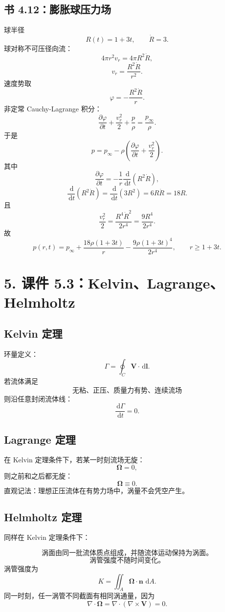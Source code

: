 \documentclass[UTF8,zihao=-4]{ctexart}
\newcommand{\dd}{\,\mathrm d}
\begin{document}
\subsection*{书 4.12：膨胀球压力场}

球半径
\[
R(t)=1+3t,\qquad \dot R=3.
\]
球对称不可压径向流：
\[
4\pi r^2v_r=4\pi R^2\dot R,
\]
\[
v_r=\frac{R^2\dot R}{r^2}.
\]
速度势取
\[
\varphi=-\frac{R^2\dot R}{r}.
\]
非定常 Cauchy-Lagrange 积分：
\[
\frac{\partial\varphi}{\partial t}
+\frac{v_r^2}{2}
+\frac p\rho
=\frac{p_\infty}{\rho}.
\]
于是
\[
p=p_\infty-\rho\left(
\frac{\partial\varphi}{\partial t}
+\frac{v_r^2}{2}
\right).
\]
其中
\[
\frac{\partial\varphi}{\partial t}
=-\frac1r\frac{\dd}{\dd t}(R^2\dot R),
\]
\[
\frac{\dd}{\dd t}(R^2\dot R)
=\frac{\dd}{\dd t}(3R^2)
=6R\dot R=18R.
\]
且
\[
\frac{v_r^2}{2}
=\frac{R^4\dot R^2}{2r^4}
=\frac{9R^4}{2r^4}.
\]
故
\[
\boxed{
p(r,t)=p_\infty
+\frac{18\rho(1+3t)}{r}
-\frac{9\rho(1+3t)^4}{2r^4},
\qquad r\ge 1+3t.}
\]

\section*{5. 课件 5.3：Kelvin、Lagrange、Helmholtz}

\subsection*{Kelvin 定理}

环量定义：
\[
\Gamma=\oint_C\bm V\cdot\dd\bm l.
\]
若流体满足
\[
\boxed{\text{无粘、正压、质量力有势、连续流场}}
\]
则沿任意封闭流体线：
\[
\boxed{\frac{\dd\Gamma}{\dd t}=0.}
\]

\subsection*{Lagrange 定理}

在 Kelvin 定理条件下，若某一时刻流场无旋：
\[
\bm\Omega=0,
\]
则之前和之后都无旋：
\[
\boxed{\bm\Omega\equiv0.}
\]
直观记法：理想正压流体在有势力场中，涡量不会凭空产生。

\subsection*{Helmholtz 定理}

同样在 Kelvin 定理条件下：

\[
\boxed{\text{涡面由同一批流体质点组成，并随流体运动保持为涡面。}}
\]
\[
\boxed{\text{涡管强度不随时间变化。}}
\]
涡管强度为
\[
\boxed{
K=\iint_A\bm\Omega\cdot\bm n\,\dd A.}
\]
同一时刻，任一涡管不同截面有相同涡通量，因为
\[
\nabla\cdot\bm\Omega=\nabla\cdot(\nabla\times\bm V)=0.
\]
\end{document}
